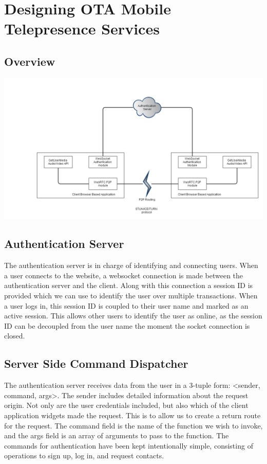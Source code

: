 \documentclass[a4paper,12pt]{report}
\begin{document}
\chapter{Designing OTA Mobile Telepresence Services}
\section{Overview}
\includegraphics[width=16cm]{NetworkModules}
\section{Authentication Server}
The authentication server is in charge of identifying and connecting users. When a user connects to the website, a websocket connection is made between the authentication server and the client. Along with this connection a session ID is provided which we can use to identify the user over multiple transactions. When a user logs in, this session ID is coupled to their user name and marked as an active session. This allows other users to identify the user as online, as the session ID can be decoupled from the user name the moment the socket connection is closed.
\section{Server Side Command Dispatcher}
The authentication server receives data from the user in a 3-tuple form: <sender, command, args>. The sender includes detailed information about the request origin. Not only are the user credentials included, but also which of the client application widgets made the request. This is to allow us to create a return route for the request. The command field is the name of the function we wish to invoke, and the args field is an array of arguments to pass to the function. The commands for authentication have been kept intentionally simple, consisting of operations to sign up, log in, and request contacts. 
\end{document}
